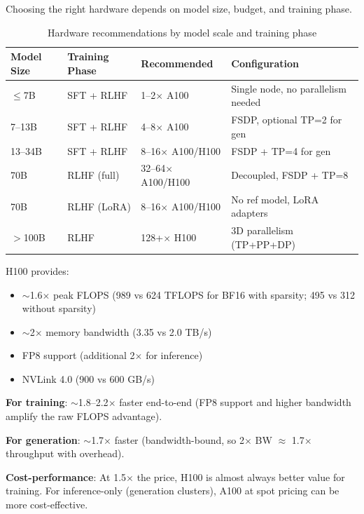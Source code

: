 Choosing the right hardware depends on model size, budget, and training phase.

\begin{table}[ht!]
\centering
\caption{Hardware recommendations by model scale and training phase}
\begin{tabular}{@{}lp{3.5cm}p{3.5cm}p{6cm}@{}}
\toprule
\textbf{Model Size} & \textbf{Training Phase} & \textbf{Recommended} & \textbf{Configuration} \\
\midrule
$\leq$7B & SFT + RLHF & 1--2$\times$ A100 & Single node, no parallelism needed \\
7--13B & SFT + RLHF & 4--8$\times$ A100 & FSDP, optional TP=2 for gen \\
13--34B & SFT + RLHF & 8--16$\times$ A100/H100 & FSDP + TP=4 for gen \\
70B & RLHF (full) & 32--64$\times$ A100/H100 & Decoupled, FSDP + TP=8 \\
70B & RLHF (LoRA) & 8--16$\times$ A100/H100 & No ref model, LoRA adapters \\
$>$100B & RLHF & 128+$\times$ H100 & 3D parallelism (TP+PP+DP) \\
\bottomrule
\end{tabular}
\end{table}

\begin{intuitionbox}
H100 provides:

\begin{itemize}
  \item $\sim$1.6$\times$ peak FLOPS (989 vs 624 TFLOPS for BF16 with sparsity; 495 vs 312 without sparsity)
  \item $\sim$2$\times$ memory bandwidth (3.35 vs 2.0 TB/s)
  \item FP8 support (additional 2$\times$ for inference)
  \item NVLink 4.0 (900 vs 600 GB/s)
\end{itemize}

\textbf{For training}: $\sim$1.8--2.2$\times$ faster end-to-end (FP8 support and higher bandwidth amplify the raw FLOPS advantage).

\textbf{For generation}: $\sim$1.7$\times$ faster (bandwidth-bound, so 2$\times$ BW $\approx$ 1.7$\times$ throughput with overhead).

\textbf{Cost-performance}: At 1.5$\times$ the price, H100 is almost always better value for training. For inference-only (generation clusters), A100 at spot pricing can be more cost-effective.
\end{intuitionbox}

